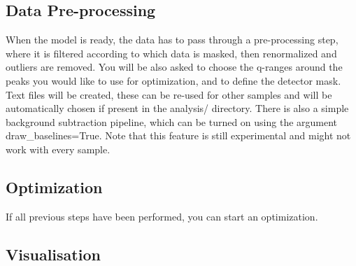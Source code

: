 \subsection{Data Pre-processing}

When the model is ready, the data has to pass through a pre-processing step, where it is filtered according to
which data is masked, then renormalized and outliers are removed. You will be also asked to choose the q-ranges
around the peaks you would like to use for optimization, and to define the detector mask.
Text files will be created, these can be re-used for other samples and will be automatically chosen if present
in the analysis/ directory.
There is also a simple background subtraction pipeline, which can be turned on using the argument draw\_baselines=True. 
Note that this feature is still experimental and might not work with every sample.



\subsection{Optimization}
If all previous steps have been performed, you can start an optimization.


\subsection{Visualisation}

